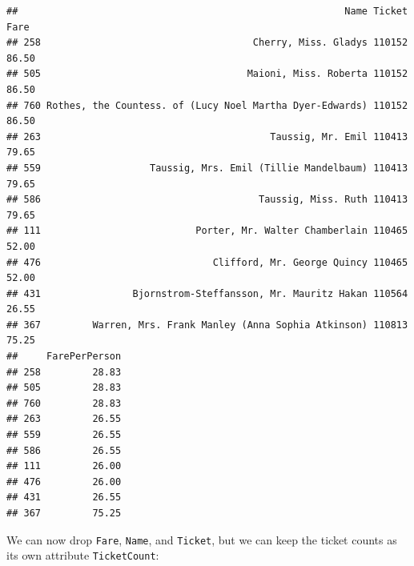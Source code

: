 \documentclass[]{article}
\newenvironment{Shaded}{\begin{snugshade}}{\end{snugshade}}
\newcommand{\KeywordTok}[1]{\textcolor[rgb]{0.13,0.29,0.53}{\textbf{#1}}}
\newcommand{\DataTypeTok}[1]{\textcolor[rgb]{0.13,0.29,0.53}{#1}}
\newcommand{\DecValTok}[1]{\textcolor[rgb]{0.00,0.00,0.81}{#1}}
\newcommand{\StringTok}[1]{\textcolor[rgb]{0.31,0.60,0.02}{#1}}
\newcommand{\CommentTok}[1]{\textcolor[rgb]{0.56,0.35,0.01}{\textit{#1}}}
\newcommand{\ControlFlowTok}[1]{\textcolor[rgb]{0.13,0.29,0.53}{\textbf{#1}}}
\newcommand{\OperatorTok}[1]{\textcolor[rgb]{0.81,0.36,0.00}{\textbf{#1}}}
\newcommand{\NormalTok}[1]{#1}
\begin{document}
\begin{verbatim}
##                                                         Name Ticket  Fare
## 258                                     Cherry, Miss. Gladys 110152 86.50
## 505                                    Maioni, Miss. Roberta 110152 86.50
## 760 Rothes, the Countess. of (Lucy Noel Martha Dyer-Edwards) 110152 86.50
## 263                                        Taussig, Mr. Emil 110413 79.65
## 559                   Taussig, Mrs. Emil (Tillie Mandelbaum) 110413 79.65
## 586                                      Taussig, Miss. Ruth 110413 79.65
## 111                           Porter, Mr. Walter Chamberlain 110465 52.00
## 476                              Clifford, Mr. George Quincy 110465 52.00
## 431                Bjornstrom-Steffansson, Mr. Mauritz Hakan 110564 26.55
## 367         Warren, Mrs. Frank Manley (Anna Sophia Atkinson) 110813 75.25
##     FarePerPerson
## 258         28.83
## 505         28.83
## 760         28.83
## 263         26.55
## 559         26.55
## 586         26.55
## 111         26.00
## 476         26.00
## 431         26.55
## 367         75.25
\end{verbatim}

We can now drop \texttt{Fare}, \texttt{Name}, and \texttt{Ticket}, but
we can keep the ticket counts as its own attribute \texttt{TicketCount}:

\begin{Shaded}
\end{Shaded}
\end{document}
